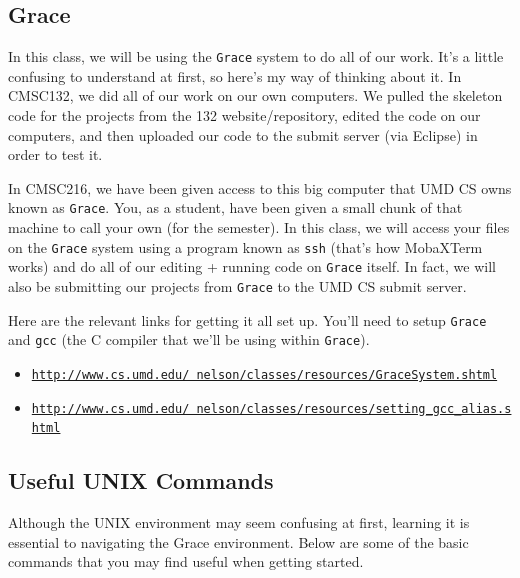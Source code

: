 \documentclass[english, 10pt]{article}
\begin{document}
\subsection{Grace}

In this class, we will be using the \texttt{Grace} system to do all of our work. It's a little confusing to understand at first, so here's my way of thinking about it. In CMSC132, we did all of our work on our own computers. We pulled the skeleton code for the projects from the 132 website/repository, edited the code on our computers, and then uploaded our code to the submit server (via Eclipse) in order to test it.\newline

In CMSC216, we have been given access to this big computer that UMD CS owns known as \texttt{Grace}. You, as a student, have been given a small chunk of that machine to call your own (for the semester). In this class, we will access your files on the \texttt{Grace} system using a program known as \texttt{ssh} (that's how MobaXTerm works) and do all of our editing + running code on \texttt{Grace} itself. In fact, we will also be submitting our projects from \texttt{Grace} to the UMD CS submit server.\newline

Here are the relevant links for getting it all set up. You'll need to setup  \texttt{Grace} and \texttt{gcc} (the C compiler that we'll be using within \texttt{Grace}).\newline\newline
\begin{itemize}
	\item \texttt{\href{http://www.cs.umd.edu/~nelson/classes/resources/GraceSystem.shtml}{http://www.cs.umd.edu/~nelson/classes/resources/GraceSystem.shtml}}
	\item \texttt{\href{http://www.cs.umd.edu/~nelson/classes/resources/setting_gcc_alias.shtml}{http://www.cs.umd.edu/~nelson/classes/resources/setting\_gcc\_alias.shtml}} 
\end{itemize}
 



\subsection{Useful UNIX Commands}

Although the UNIX environment may seem confusing at first, learning it is essential to navigating the Grace environment. Below are some of the basic commands that you may find useful when getting started.
\end{document}

